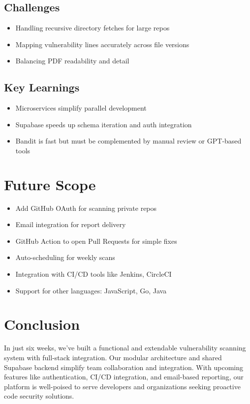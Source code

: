\documentclass{article}
\begin{document}
\subsection{Challenges}
\begin{itemize}
    \item Handling recursive directory fetches for large repos
    \item Mapping vulnerability lines accurately across file versions
    \item Balancing PDF readability and detail
\end{itemize}

\subsection{Key Learnings}
\begin{itemize}
    \item Microservices simplify parallel development
    \item Supabase speeds up schema iteration and auth integration
    \item Bandit is fast but must be complemented by manual review or GPT-based tools
\end{itemize}

\section{Future Scope}
\begin{itemize}
    \item Add GitHub OAuth for scanning private repos
    \item Email integration for report delivery
    \item GitHub Action to open Pull Requests for simple fixes
    \item Auto-scheduling for weekly scans
    \item Integration with CI/CD tools like Jenkins, CircleCI
    \item Support for other languages: JavaScript, Go, Java
\end{itemize}

\section{Conclusion}
In just six weeks, we’ve built a functional and extendable vulnerability scanning system with full-stack integration. Our modular architecture and shared Supabase backend simplify team collaboration and integration. With upcoming features like authentication, CI/CD integration, and email-based reporting, our platform is well-poised to serve developers and organizations seeking proactive code security solutions.
\end{document}
